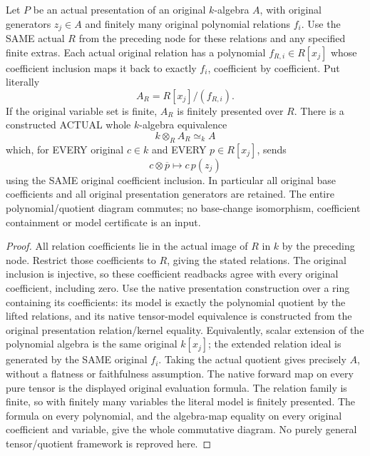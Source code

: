 \begin{theorem}
\label{thm:arithmetic-same-presentation-model}
\leanok
{}
Let $P$ be an actual presentation of an original $k$-algebra $A$, with
original generators $z_j\in A$ and finitely many original polynomial
relations $f_i$. Use the SAME actual $R$ from the preceding node for these
relations and any specified finite extras. Each actual original relation
has a polynomial $f_{R,i}\in R[x_j]$ whose coefficient inclusion maps it
back to exactly $f_i$, coefficient by coefficient. Put literally
\[ A_R=R[x_j]/(f_{R,i}). \]
If the original variable set is finite, $A_R$ is finitely presented over $R$.
There is a constructed ACTUAL whole $k$-algebra equivalence
\[ k\otimes_R A_R\simeq_k A \]
which, for EVERY original $c\in k$ and EVERY $p\in R[x_j]$, sends
\[
 c\otimes\overline p\longmapsto c\,p(z_j)
\]
using the SAME original coefficient inclusion. In particular all original
base coefficients and all original presentation generators are retained.
The entire polynomial/quotient diagram commutes; no base-change
isomorphism, coefficient containment or model certificate is an input.
\end{theorem}
\begin{proof}
All relation coefficients lie in the actual image of $R$ in $k$ by the
preceding node. Restrict those coefficients to $R$, giving the stated
relations. The original inclusion is injective, so these coefficient
readbacks agree with every original coefficient, including zero.
Use the native presentation construction over a ring containing its
coefficients: its model is exactly the polynomial quotient by the lifted
relations, and its native tensor-model equivalence is constructed from the
original presentation relation/kernel equality. Equivalently, scalar
extension of the polynomial algebra is the same original $k[x_j]$;
the extended relation ideal is generated by the SAME original $f_i$.
Taking the actual quotient gives precisely $A$, without a flatness or
faithfulness assumption. The native forward map on every pure tensor is
the displayed original evaluation formula. The relation family is finite,
so with finitely many variables the literal model is finitely presented.
The formula on every polynomial, and the algebra-map equality on every
original coefficient and variable, give the whole commutative diagram.
No purely general tensor/quotient framework is reproved here.
\end{proof}

